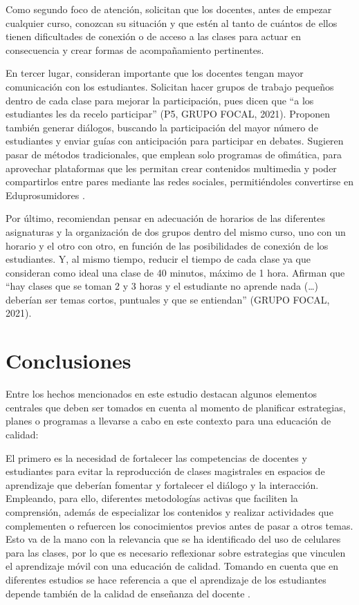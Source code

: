 \documentclass[spanish]{textolivre}
\begin{document}
Como segundo foco de atención, solicitan que los docentes, antes de empezar cualquier curso, conozcan su situación y que estén al tanto de cuántos de ellos tienen dificultades de conexión o de acceso a las clases para actuar en consecuencia y crear formas de acompañamiento pertinentes.

En tercer lugar, consideran importante que los docentes tengan mayor comunicación con los estudiantes. Solicitan hacer grupos de trabajo pequeños dentro de cada clase para mejorar la participación, pues dicen que “a los estudiantes les da recelo participar” (P5, GRUPO FOCAL, 2021). Proponen también generar diálogos, buscando la participación del mayor número de estudiantes y enviar guías con anticipación para participar en debates. Sugieren pasar de métodos tradicionales, que emplean solo programas de ofimática, para aprovechar plataformas que les permitan crear contenidos multimedia y poder compartirlos entre pares mediante las redes sociales, permitiéndoles convertirse en Eduprosumidores \cite{basantes-andrade_eduprosumers:_2020b}.

Por último, recomiendan pensar en adecuación de horarios de las diferentes asignaturas y la organización de dos grupos dentro del mismo curso, uno con un horario y el otro con otro, en función de las posibilidades de conexión de los estudiantes. Y, al mismo tiempo, reducir el tiempo de cada clase ya que consideran como ideal una clase de 40 minutos, máximo de 1 hora. Afirman que “hay clases que se toman 2 y 3 horas y el estudiante no aprende nada (…) deberían ser temas cortos, puntuales y que se entiendan” (GRUPO FOCAL, 2021).

\section{Conclusiones}\label{sec-organizacao}
Entre los hechos mencionados en este estudio destacan algunos elementos centrales que deben ser tomados en cuenta al momento de planificar estrategias, planes o programas a llevarse a cabo en este contexto para una educación de calidad:

El primero es la necesidad de fortalecer las competencias de docentes y estudiantes para evitar la reproducción de clases magistrales en espacios de aprendizaje que deberían fomentar y fortalecer el diálogo y la interacción. Empleando, para ello, diferentes metodologías activas que faciliten la comprensión, además de especializar los contenidos y realizar actividades que complementen o refuercen los conocimientos previos antes de pasar a otros temas. Esto va de la mano con la relevancia que se ha identificado del uso de celulares para las clases, por lo que es necesario reflexionar sobre estrategias que vinculen el aprendizaje móvil con una educación de calidad. Tomando en cuenta que en diferentes estudios se hace referencia a que el aprendizaje de los estudiantes depende también de la calidad de enseñanza del docente \cite{barber_como_2008}.
\end{document}
